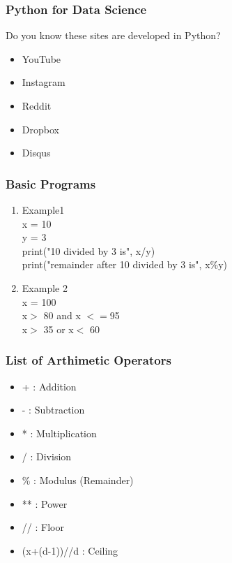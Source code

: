 \documentclass{beamer}
\theoremstyle{plain}
\theoremstyle{definition}
\begin{document}
\begin{frame}
      \frametitle{Python for Data Science}
       Do you know these sites are developed in Python?
			\begin{itemize}
			\item YouTube
			\item Instagram
		   \item 	Reddit
			\item Dropbox
			\item Disqus
			\end{itemize}
			

\end{frame} 

\begin{frame}
      \frametitle{Basic Programs}
      \begin{enumerate}
      	\item Example1 \\
      	 x = 10 \\
      	 y = 3 \\
      	 print("10 divided by 3 is", x/y) \\
      	 print("remainder after 10 divided by 3 is", x\%y)
      	 \item Example 2 \\
      	  x = 100 \\
      	  x$ >$ 80 and x $<=$95 \\
      	  x$ >$ 35 or x$ <$  60 \\
      \end{enumerate}
      		
\end{frame}

\begin{frame}
      \frametitle{List of Arthimetic Operators}
      \begin{itemize}
     \item  + : Addition \\
     \item  - : Subtraction \\
      \item * : Multiplication \\
      \item / : Division \\
	  \item \% : Modulus (Remainder) \\
	 \item  ** : Power \\
	  \item // : Floor \\
	  \item (x+(d-1))//d : Ceiling \\
      \end{itemize}
\end{frame}
\end{document}
